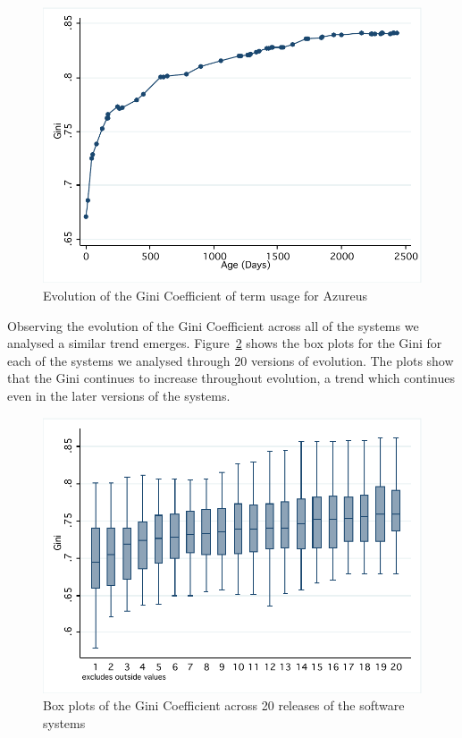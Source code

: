 \begin{figure}[t]
\centering
\includegraphics[width=\textwidth]{Figures/Vocab-AzureusGini.pdf}
\caption{Evolution of the Gini Coefficient of term usage for Azureus}
\label{fig:vocab-gini-azureus}
\end{figure}

Observing the evolution of the Gini Coefficient across all of the systems we analysed a similar trend emerges. Figure~\ref{fig:vocab-gini-rsn20-box} shows the box plots for the Gini for each of the systems we analysed through 20 versions of evolution. The plots show that the Gini continues to increase throughout evolution, a trend which continues even in the later versions of the systems.

\begin{figure}[t]
\centering
\includegraphics[width=\textwidth]{Figures/Vocab-RSN20GiniBox.pdf}
\caption{Box plots of the Gini Coefficient across 20 releases of the software systems}
\label{fig:vocab-gini-rsn20-box}
\end{figure}

